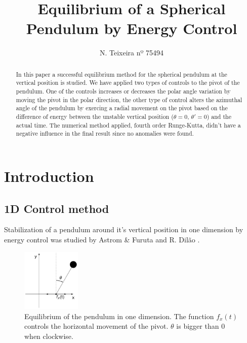 \documentclass[prd,twocolumn,nofootinbib,showpacs]{revtex4-1}
\begin{document}

\title{Equilibrium of a Spherical Pendulum by Energy Control}

\author{N. Teixeira  nº 75494}


\begin{abstract}
In this paper a successful equilibrium method for the spherical pendulum at the vertical position is studied. We have applied two types of controls to the pivot of the pendulum. One of the  controls increases or decreases the polar angle variation by moving the pivot in the polar direction, the other type of control alters the azimuthal angle of the pendulum by exercing a radial movement on the pivot based on the difference of energy between the unstable vertical position ($\theta=0$, $\theta'=0$) and the actual time. The numerical method applied, fourth order Runge-Kutta, didn't have a negative influence in the final result since no anomalies were found.
\end{abstract}

\maketitle

\section{Introduction}
\subsection{1D Control method}\label{1D}



\noindent Stabilization of a pendulum around it's vertical position in one dimension by energy control was studied by Astrom \& Furuta \cite{Furtura} and R. Dilão \cite{Dilao}. 

\begin{figure}[H]
    \centering
    \includegraphics[width=0.25\textwidth]{pend1d.png}
    \caption{Equilibrium of the pendulum in one dimension. The function $f_x(t)$ controls the horizontal movement of the pivot.  $\theta$ is bigger than $0$ when clockwise.}
    \label{fig:1D}
\end{figure}
\end{document}
